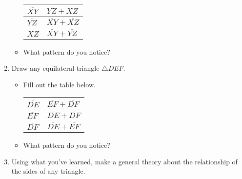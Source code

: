 \documentclass[12pt,letterpaper]{article}
\begin{document}
\begin{enumerate}
\begin{itemize}
                    \begin{tabularx}{0.95\textwidth} {
                            | >{\centering\arraybackslash}X
                            | >{\centering\arraybackslash}X |}
                        \hline
                        $\overline{XY}$\vspace{10mm} & $\overline{YZ} + \overline{XZ}$ \\
                        \hline
                        $\overline{YZ}$\vspace{10mm} & $\overline{XY} + \overline{XZ}$ \\
                        \hline
                        $\overline{XZ}$\vspace{10mm} & $\overline{XY} + \overline{YZ}$ \\
                        \hline
                    \end{tabularx}
              \item What pattern do you notice?
          \end{itemize}
    \item Draw any equilateral triangle $\triangle DEF$.
          \begin{itemize}
              \item Fill out the table below.

                    \begin{tabularx}{0.95\textwidth} {
                            | >{\centering\arraybackslash}X
                            | >{\centering\arraybackslash}X |}
                        \hline
                        $\overline{DE}$\vspace{10mm} & $\overline{EF} + \overline{DF}$ \\
                        \hline
                        $\overline{EF}$\vspace{10mm} & $\overline{DE} + \overline{DF}$ \\
                        \hline
                        $\overline{DF}$\vspace{10mm} & $\overline{DE} + \overline{EF}$ \\
                        \hline
                    \end{tabularx}
              \item What pattern do you notice?
          \end{itemize}
    \item Using what you've learned, make a general theory about the relationship of the sides of any triangle.
\end{enumerate}
\end{document}
